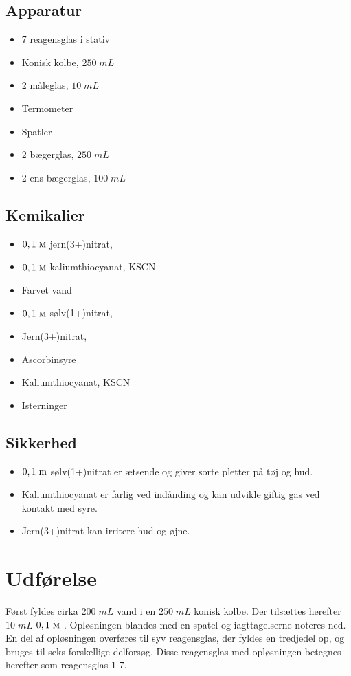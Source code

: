 \documentclass{report}
\begin{document}
\subsection*{Apparatur}
\begin{itemize}
  \item 7 reagensglas i stativ
  \item Konisk kolbe, $250 \;\unit{mL} $
\item 2 måleglas, $10 \;\unit{mL} $
\item Termometer
\item Spatler
\item 2 bægerglas, $250 \;\unit{mL} $
\item 2 ens bægerglas, $100 \;\unit{mL} $
\end{itemize}
\subsection*{Kemikalier}
\begin{itemize}
  \item $0,1 \;\unit{\textsc{m}}$ jern(3+)nitrat,  
\item $0,1 \;\unit{\textsc{m}}$ kaliumthiocyanat, KSCN 
\item Farvet vand
  \item $0,1 \;\unit{\textsc{m}}$ sølv(1+)nitrat,  
  \item Jern(3+)nitrat,  
\item Ascorbinsyre
\item Kaliumthiocyanat, KSCN
\item Isterninger
\end{itemize}
\subsection*{Sikkerhed}
\begin{itemize}
  \item $0,1 \;\unit{\sc{m}}$ sølv(1+)nitrat er ætsende og giver sorte pletter på tøj og hud.
\item Kaliumthiocyanat er farlig ved indånding og kan udvikle giftig gas ved kontakt med syre.
  \item Jern(3+)nitrat kan irritere hud og øjne.
\end{itemize}

\section*{Udførelse}
Først fyldes cirka $200 \;\unit{mL} $ vand i en $250 \;\unit{mL} $ konisk kolbe.
Der tilsættes herefter $10 \;\unit{mL} $ $0,1 \;\unit{\textsc{m}} $ .
Opløsningen blandes med en spatel og iagttagelserne noteres ned.
En del af opløsningen overføres til syv reagensglas, der fyldes en tredjedel op, og bruges til seks forskellige delforsøg.
Disse reagensglas med opløsningen betegnes herefter som reagensglas 1-7.
\end{document}
